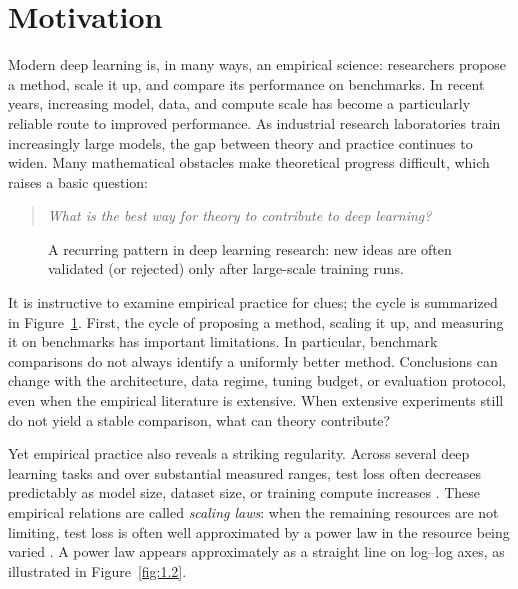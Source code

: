 \section{Motivation}

Modern deep learning is, in many ways, an empirical science: researchers propose a method, scale it up, and compare its performance on benchmarks. In recent years, increasing model, data, and compute scale has become a particularly reliable route to improved performance. As industrial research laboratories train increasingly large models, the gap between theory and practice continues to widen. Many mathematical obstacles make theoretical progress difficult, which raises a basic question:
\begin{quote}
\itshape What is the best way for theory to contribute to deep learning?
\end{quote}

\begin{figure}[t]
\centering
{}
\caption{A recurring pattern in deep learning research: new ideas are often validated (or rejected) only after large-scale training runs.}
\label{fig:1.1}
\end{figure}

It is instructive to examine empirical practice for clues; the cycle is summarized in Figure~\ref{fig:1.1}. First, the cycle of proposing a method, scaling it up, and measuring it on benchmarks has important limitations. In particular, benchmark comparisons do not always identify a uniformly better method. Conclusions can change with the architecture, data regime, tuning budget, or evaluation protocol, even when the empirical literature is extensive. When extensive experiments still do not yield a stable comparison, what can theory contribute?

Yet empirical practice also reveals a striking regularity. Across several deep learning tasks and over substantial measured ranges, test loss often decreases predictably as model size, dataset size, or training compute increases \cite{hestness2017deep}. These empirical relations are called \emph{scaling laws}: when the remaining resources are not limiting, test loss is often well approximated by a power law in the resource being varied \cite{kaplan2020scaling}. A power law appears approximately as a straight line on log--log axes, as illustrated in Figure~\ref{fig:1.2}.

